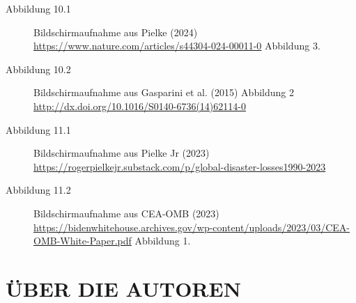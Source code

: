 \documentclass[12pt,paper=a4,DIV=12,parskip=never,chapterprefix=false,headings=standardclasses]{scrreprt}
\begin{document}
\begin{description}
\item[Abbildung 10.1] Bildschirmaufnahme aus Pielke (2024) \url{https://www.nature.com/articles/s44304-024-00011-0} Abbildung 3.
\item[Abbildung 10.2] Bildschirmaufnahme aus Gasparini et al. (2015) Abbildung 2 \url{http://dx.doi.org/10.1016/S0140-6736(14)62114-0}
\item[Abbildung 11.1] Bildschirmaufnahme aus Pielke Jr (2023) \url{https://rogerpielkejr.substack.com/p/global-disaster-losses1990-2023}
\item[Abbildung 11.2] Bildschirmaufnahme aus CEA-OMB (2023) \url{https://bidenwhitehouse.archives.gov/wp-content/uploads/2023/03/CEA-OMB-White-Paper.pdf} Abbildung 1.
\end{description}


\cleardoublepage
\section*{ÜBER DIE AUTOREN}
\end{document}
